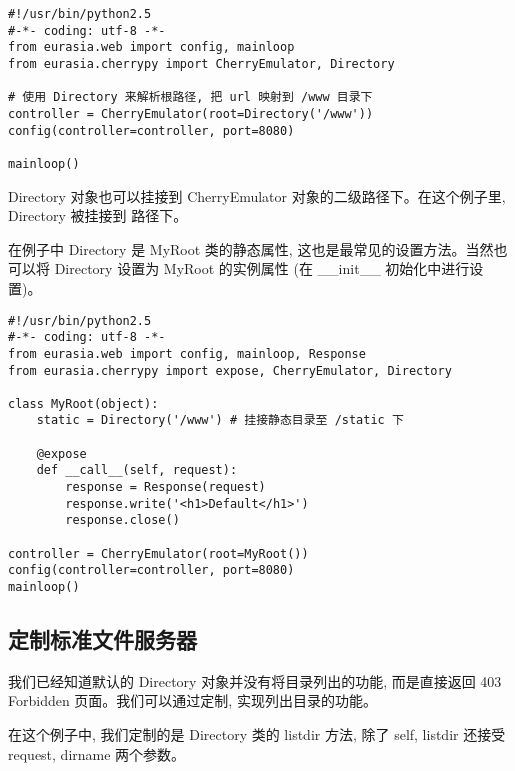 \documentclass{manual}
\begin{document}



\begin{verbatim}
#!/usr/bin/python2.5
#-*- coding: utf-8 -*-
from eurasia.web import config, mainloop
from eurasia.cherrypy import CherryEmulator, Directory

# 使用 Directory 来解析根路径, 把 url 映射到 /www 目录下
controller = CherryEmulator(root=Directory('/www'))
config(controller=controller, port=8080)

mainloop()
\end{verbatim}

Directory 对象也可以挂接到 CherryEmulator 对象的二级路径下。在这个例子里, Directory 被挂接到  路径下。

在例子中 Directory 是 MyRoot 类的静态属性, 这也是最常见的设置方法。当然也可以将 Directory 设置为 MyRoot 的实例属性 (在 __init__ 初始化中进行设置)。

\begin{verbatim}
#!/usr/bin/python2.5
#-*- coding: utf-8 -*-
from eurasia.web import config, mainloop, Response
from eurasia.cherrypy import expose, CherryEmulator, Directory

class MyRoot(object):
	static = Directory('/www') # 挂接静态目录至 /static 下

	@expose
	def __call__(self, request):
		response = Response(request)
		response.write('<h1>Default</h1>')
		response.close()

controller = CherryEmulator(root=MyRoot())
config(controller=controller, port=8080)
mainloop()
\end{verbatim}

\subsection{定制标准文件服务器}

我们已经知道默认的 Directory 对象并没有将目录列出的功能, 而是直接返回 403 Forbidden 页面。我们可以通过定制, 实现列出目录的功能。

在这个例子中, 我们定制的是 Directory 类的 listdir 方法, 除了 self, listdir 还接受 request, dirname 两个参数。
\end{document}
